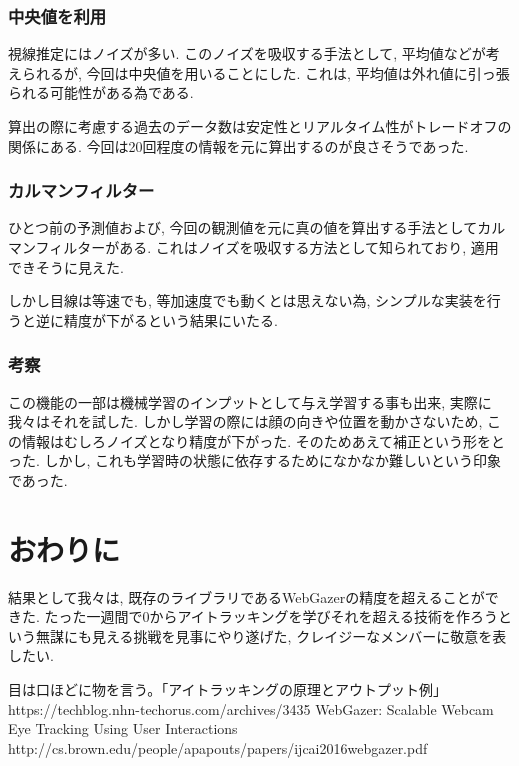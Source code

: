 \documentclass[a4paper,11pt]{jsarticle}
\begin{document}
\subsubsection{中央値を利用}
視線推定にはノイズが多い. 
このノイズを吸収する手法として, 平均値などが考えられるが, 今回は中央値を用いることにした.
これは, 平均値は外れ値に引っ張られる可能性がある為である.

算出の際に考慮する過去のデータ数は安定性とリアルタイム性がトレードオフの関係にある.
今回は20回程度の情報を元に算出するのが良さそうであった.

\subsubsection{カルマンフィルター}
ひとつ前の予測値および, 今回の観測値を元に真の値を算出する手法としてカルマンフィルターがある.
これはノイズを吸収する方法として知られており, 適用できそうに見えた.

しかし目線は等速でも, 等加速度でも動くとは思えない為, シンプルな実装を行うと逆に精度が下がるという結果にいたる.

\subsubsection{考察}
この機能の一部は機械学習のインプットとして与え学習する事も出来, 実際に我々はそれを試した.
しかし学習の際には顔の向きや位置を動かさないため, この情報はむしろノイズとなり精度が下がった.
そのためあえて補正という形をとった. しかし, これも学習時の状態に依存するためになかなか難しいという印象であった.

\section{おわりに}
結果として我々は, 既存のライブラリであるWebGazerの精度を超えることができた.
たった一週間で0からアイトラッキングを学びそれを超える技術を作ろうという無謀にも見える挑戦を見事にやり遂げた, クレイジーなメンバーに敬意を表したい.

\begin{thebibliography}{}
   目は口ほどに物を言う。「アイトラッキングの原理とアウトプット例」 https://techblog.nhn-techorus.com/archives/3435
   WebGazer: Scalable Webcam Eye Tracking Using User Interactions http://cs.brown.edu/people/apapouts/papers/ijcai2016webgazer.pdf
\end{thebibliography}
\end{document}
